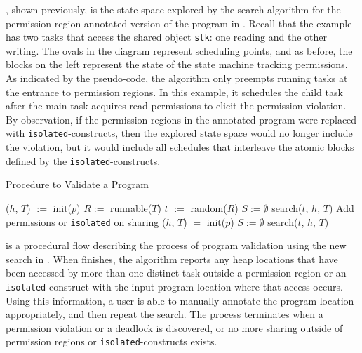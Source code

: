 , shown previously, is the
state space explored by the search algorithm for the permission region
annotated version of the program in
. Recall that the example has two tasks
that access the shared object {\tt stk}: one reading and the other writing. The
ovals in the diagram represent scheduling points, and as before, the
blocks on the left represent the state of the state machine tracking permissions. As
indicated by the pseudo-code, the algorithm only preempts running
tasks at the entrance to permission regions. In this example, it
schedules the child task after the main task acquires read permissions
to elicit the permission violation. By observation, if the permission regions in
the annotated program were replaced
with \texttt{isolated}-constructs, then the explored state space would
no longer include the violation, but it would include all schedules
that interleave the atomic blocks defined by the \texttt{isolated}-constructs.

\begin{algorithm}[t]
\caption{Procedure to Validate a Program}\label{algo:validate}
\begin{algorithmic}[l]
  \State ($h$, $T$) $:=$ init($p$)
  \State $R := $ runnable($T$)
  \State $t$ $:=$ random($R$)
  \State $S := \emptyset$
  \State search($t$, $h$, $T$)
  \State Add permissions or {\tt isolated} on sharing
  \State ($h$, $T$) $=$ init($p$)
  \State $S := \emptyset$
  \State search($t$, $h$, $T$)
  \EndWhile
  \EndProcedure
\end{algorithmic}
\end{algorithm}

 is a procedural flow describing the process of
program validation using the new search in
. When 
finishes, the algorithm reports any heap locations that have been accessed by
more than one distinct task outside a permission region or an
\texttt{isolated}-construct with the input program location where that
access occurs. Using this information, a user is able to manually
annotate the program location appropriately, and then repeat the
search. The process terminates when a permission violation or a deadlock is
discovered, or no more sharing outside of permission regions or \texttt{isolated}-constructs exists.

